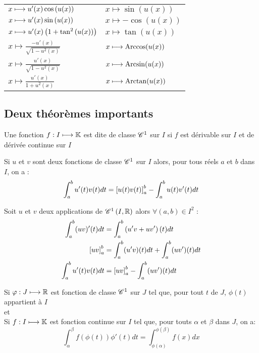\begin{defprop}
\begin{center}
\begin{tabular}{|l|l|}
            \(x\longmapsto u'(x)\cos\left(u(x)\right)\) & \(x\mapsto \sin(u(x)) \) \\
            \(x\longmapsto u'(x)\sin\left(u(x)\right)\) & \(x\mapsto -\cos(u(x)) \) \\
            \(x\longmapsto u'(x)\left(1+\tan^2\left(u(x)\right)\right)\) & \(x\mapsto \tan(u(x)) \) \\
            \hline
            \(x\mapsto \frac{-u'(x)}{\sqrt{1-u^2(x)}}\) & \(x\longmapsto \operatorname{Arccos}(u(x)) \)\\
            \(x\mapsto \frac{u'(x)}{\sqrt{1-u^2(x)}}\) & \(x\longmapsto \operatorname{Arcsin}(u(x)) \)  \\
            \(x\mapsto \frac{u'(x)}{1+u^2(x)}\) & \(x\longmapsto \operatorname{Arctan}(u(x)) \) \\
            \hline
	    \end{tabular}
    \end{center}
\end{defprop}

\subsection{Deux théorèmes importants}
\begin{defi}[préliminaire]
    Une fonction \(f : I \longmapsto \mathbb{K}\) est dite de classe \(\mathscr{C}^{1}\) sur \(I\) si \(f\) est dérivable sur \(I\) et de dérivée continue sur \(I\)
\end{defi}

\begin{theo}
    Si \(u\) et \(v\) sont deux fonctions de classe \(\mathscr{C}^{1}\) sur \(I\) alors, pour tous réels \(a\) et \(b\) dans \(I\), on a :
    \[\int_{a}^{b}u'(t)v(t)dt = \left[u(t)v(t)\right]^b_a - \int_{a}^{b}u(t)v'(t)dt\]
\end{theo}

\begin{dem}
    Soit \(u\) et \(v\) deux applications de \(\mathscr{C}^{1}\left(I,\mathbb{R}\right)\) alors \(\forall (a,b) \in I^2\) : 
    \[
    \begin{aligned}
        \int_{a}^{b}(uv)'(t)dt &= \int_{a}^{b}\left(u'v+uv'\right)(t)dt \\
         \left[uv\right]^b_a &= \int_{a}^{b}(u'v)(t)dt + \int_{a}^{b}(uv')(t)dt \\
          \int_{a}^{b}u'(t)v(t)dt &= \left[uv\right]^b_a- \int_{a}^{b}(uv')(t)dt 
    \end{aligned}
    \]
\end{dem}
\begin{theo}
    Si \(\varphi  :J \longmapsto \mathbb{R}\) est fonction de classe \(\mathscr{C}^{1}\) sur \(J\) tel que, pour tout \(t\) de \(J\), \(\phi(t)\) appartient à \(I\) \\
    et\\
    Si \(f  :I\longmapsto \mathbb{K}\) est fonction continue sur \(I\) tel que, pour touts \(\alpha\) et \(\beta\) dans \(J\), on a: 
    \[\int_{\alpha}^{\beta} f(\phi(t))\phi'(t) dt = \int_{\phi(\alpha)}^{\phi(\beta)}f(x)dx\]
\end{theo}


